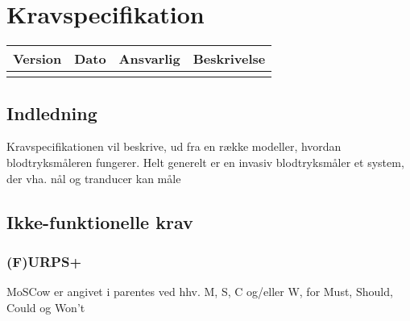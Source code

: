 \chapter{Kravspecifikation}

\begin{longtabu} to 
    Version &    Dato &    Ansvarlig &    Beskrivelse\\[-1ex]
    \midrule
\label{version_Systemark}
\end{longtabu}


\section{Indledning}
Kravspecifikationen vil beskrive, ud fra en række modeller, hvordan blodtryksmåleren fungerer. Helt generelt er en invasiv blodtryksmåler et system, der vha. nål og tranducer kan måle 

\section{Ikke-funktionelle krav}
\subsection{(F)URPS+}
MoSCow er angivet i parentes ved hhv. M, S, C og/eller W, for Must, Should, Could og Won't\\


